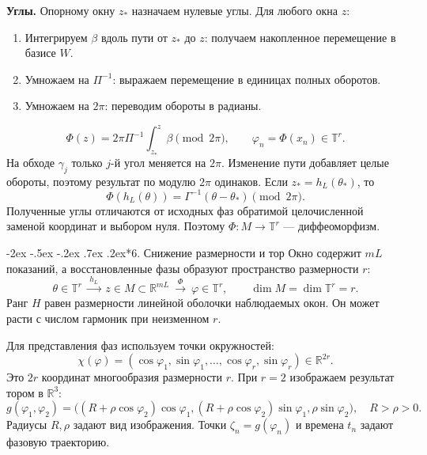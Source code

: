 \documentclass[11pt,a4paper]{article}
\makeatletter
\renewcommand\section{\@startsection{section}{1}{\z@}%
  {-2ex \@plus -.5ex \@minus -.2ex}%
  {.7ex \@plus .2ex}{\normalfont\Large\bfseries}}
\makeatother
\begin{document}
\textbf{Углы.}
Опорному окну $z_*$ назначаем нулевые углы. Для любого окна $z$:
\begin{enumerate}
\setlength{\itemsep}{1pt}
\item Интегрируем $\beta$ вдоль пути от $z_*$ до $z$:
получаем накопленное перемещение в базисе $W$.
\item Умножаем на $\Pi^{-1}$: выражаем перемещение в единицах полных оборотов.
\item Умножаем на $2\pi$: переводим обороты в радианы.
\end{enumerate}
\begin{equation}
\Phi(z)=2\pi\Pi^{-1}\int_{z_*}^{z}\beta\pmod{2\pi},
\qquad \varphi_n=\Phi(x_n)\in\mathbb T^r.
\label{eq:phase-map}
\end{equation}
На обходе $\gamma_j$ только $j$-й угол меняется на $2\pi$.
Изменение пути добавляет целые обороты, поэтому результат по модулю $2\pi$ одинаков.
Если $z_*=h_L(\theta_*)$, то
$$
\Phi(h_L(\theta))=\Gamma^{-1}(\theta-\theta_*)\pmod{2\pi}.
$$
Полученные углы отличаются от исходных фаз обратимой целочисленной заменой
координат и выбором нуля. Поэтому $\Phi:M\to\mathbb T^r$ --- диффеоморфизм.

\section*{6. Снижение размерности и тор}
Окно содержит $mL$ показаний, а восстановленные фазы образуют пространство размерности $r$:
$$
\theta\in\mathbb T^r
\ \xrightarrow{\ h_L\ }\ z\in M\subset\mathbb R^{mL}
\ \xrightarrow{\ \Phi\ }\ \varphi\in\mathbb T^r,
\qquad \dim M=\dim\mathbb T^r=r.
$$
Ранг $H$ равен размерности линейной оболочки наблюдаемых окон.
Он может расти с числом гармоник при неизменном $r$.

Для представления фаз используем точки окружностей:
\begin{equation}
\chi(\varphi)=(\cos\varphi_1,\sin\varphi_1,\ldots,
\cos\varphi_r,\sin\varphi_r)\in\mathbb R^{2r}.
\label{eq:circle-coordinates}
\end{equation}
Это $2r$ координат многообразия размерности $r$.
При $r=2$ изображаем результат тором в $\mathbb R^3$:
\begin{equation}
g(\varphi_1,\varphi_2)=
\bigl((R+\rho\cos\varphi_2)\cos\varphi_1,
(R+\rho\cos\varphi_2)\sin\varphi_1,\rho\sin\varphi_2\bigr),\quad R>\rho>0.
\label{eq:torus-embedding}
\end{equation}
Радиусы $R,\rho$ задают вид изображения.
Точки $\zeta_n=g(\varphi_n)$ и времена $t_n$ задают фазовую траекторию.
\end{document}
